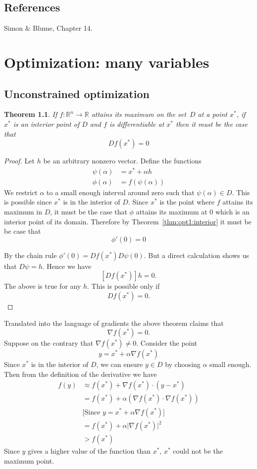\documentclass[11pt,reqno,openany]{amsbook}
\numberwithin{figure}{chapter}
\numberwithin{equation}{chapter}
\theoremstyle{plain}
\newtheorem{thm}{Theorem}[chapter]
\theoremstyle{definition}
\newcommand{\dotprod}[2]{{#1}\cdot{#2}}
\renewcommand{\Re}{\mathbb{R}}
\begin{document}
\section*{References}
Simon \& Blume, Chapter 14.

\chapter{Optimization: many variables}
\section{Unconstrained optimization}
\begin{thm}\label{thm-nvar-ucopti}
  If $f\colon \Re^n \to \Re$ attains its maximum  on the
  set~$D$ at a point $x^*$, if $x^*$ is an interior point of $D$
  and $f$ is differentiable at $x^*$ then it must be the case
  that
  \[Df(x^*)=0\]
\end{thm}
\begin{proof}
  Let $h$ be an arbitrary nonzero vector. Define the
  functions
  \begin{align*}
    \psi(\alpha) & = x^*+\alpha h\\
    \phi(\alpha) &= f(\psi(\alpha))
  \end{align*}
  We restrict $\alpha$ to a small enough interval around
  zero such that $\psi(\alpha) \in D$. This is possible since
  $x^*$ is in the interior of $D$. Since $x^*$ is the point
  where $f$ attains its maximum in $D$, it must be the case
  that $\phi$ attains its maximum at $0$ which is an
  interior point of its domain. Therefore by
  Theorem~\ref{thm:opt1:interior} it must be be case that
  \[\phi'(0) = 0\]
  

  By the chain rule $\phi'(0) = Df(x^*)D\psi(0)$. But a
  direct calculation shows us that $D\psi = h$. Hence we
  have
  \[[Df(x^*)]h=0.\]
  The above is true for any $h$. This is possible only if
  \[Df(x^*)=0.\]
\end{proof}

Translated into the language of gradients the above theorem
claims that
\[\nabla f(x^*)=0.\]
Suppose on the contrary that $\nabla f(x^*) \ne 0$. Consider the
point
\[y = x^* + \alpha\nabla f(x^*)\]
Since $x^*$ is in the interior of $D$, we can ensure $y \in
D$ by choosing $\alpha$ small enough. Then from the
definition of the derivative we have
\begin{align*}
f(y) &\approx
f(x^*) + \dotprod{\nabla f(x^*)}{(y-x^*)}\\
&=f(x^*) + \alpha (\dotprod{\nabla f(x^*)}{\nabla f(x^*)})\\
&\text{[Since $y = x^*+\alpha\nabla f(x^*)$]}\\
&=f(x^*) + \alpha \lvert \nabla f(x^*) \rvert^2\\
&>f(x^*)
\end{align*}
Since $y$ gives a higher value of the function than $x^*$,
$x^*$ could not be the maximum point. 
\end{document}
